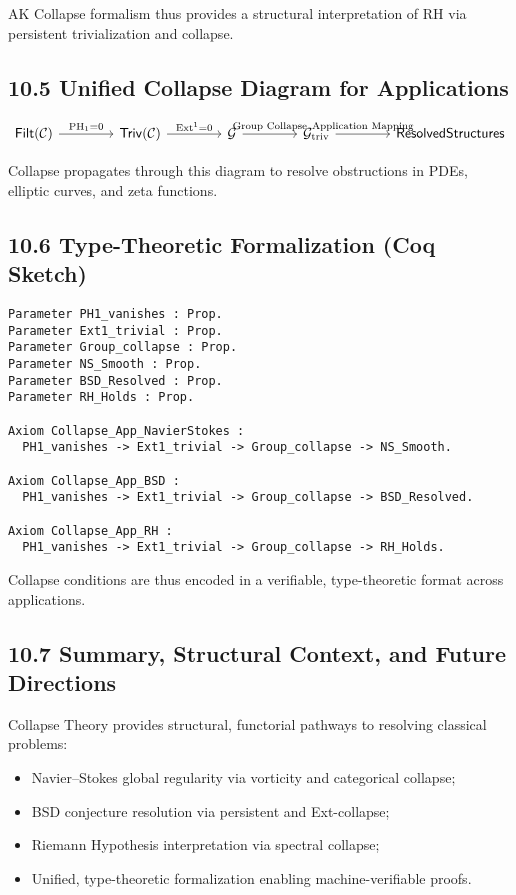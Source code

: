 \documentclass[11pt]{article}
\begin{document}
AK Collapse formalism thus provides a structural interpretation of RH via persistent trivialization and collapse.

\subsection*{10.5 Unified Collapse Diagram for Applications}

\[
\begin{tikzcd}[column sep=4em]
\mathsf{Filt}(\mathcal{C}) \arrow[r, "\mathrm{PH}_1 = 0"]
& \mathsf{Triv}(\mathcal{C}) \arrow[r, "\mathrm{Ext}^1 = 0"]
& \mathcal{G} \arrow[r, "\text{Group Collapse}"]
& \mathcal{G}_{\mathrm{triv}} \arrow[r, "\text{Application Mapping}"]
& \mathsf{Resolved Structures}
\end{tikzcd}
\]

Collapse propagates through this diagram to resolve obstructions in PDEs, elliptic curves, and zeta functions.

\subsection*{10.6 Type-Theoretic Formalization (Coq Sketch)}

\begin{lstlisting}[language=Coq]
Parameter PH1_vanishes : Prop.
Parameter Ext1_trivial : Prop.
Parameter Group_collapse : Prop.
Parameter NS_Smooth : Prop.
Parameter BSD_Resolved : Prop.
Parameter RH_Holds : Prop.

Axiom Collapse_App_NavierStokes :
  PH1_vanishes -> Ext1_trivial -> Group_collapse -> NS_Smooth.

Axiom Collapse_App_BSD :
  PH1_vanishes -> Ext1_trivial -> Group_collapse -> BSD_Resolved.

Axiom Collapse_App_RH :
  PH1_vanishes -> Ext1_trivial -> Group_collapse -> RH_Holds.
\end{lstlisting}

Collapse conditions are thus encoded in a verifiable, type-theoretic format across applications.

\subsection*{10.7 Summary, Structural Context, and Future Directions}

Collapse Theory provides structural, functorial pathways to resolving classical problems:

\begin{itemize}
    \item Navier–Stokes global regularity via vorticity and categorical collapse;
    \item BSD conjecture resolution via persistent and Ext-collapse;
    \item Riemann Hypothesis interpretation via spectral collapse;
    \item Unified, type-theoretic formalization enabling machine-verifiable proofs.
\end{itemize}
\end{document}
